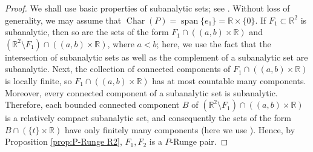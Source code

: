 \documentclass[a4paper,10pt]{amsart}
\newtheorem*{crucial lemma}{Lemma \ref{lem:nice polynomial2}}
\theoremstyle{definition}
\newcommand{\R}{\mathbb{R}}
\newcommand{\charcone}{\operatorname{Char}}
\begin{document}
\begin{proof}
We shall use basic properties of subanalytic sets; see \cite[Remark after Definition  3.1, Gabrielov’s Complement Theorem 3.10 and Theorem 3.14]{BierstoneMilman1988}. Without loss of generality, we may assume that $\charcone(P)=\operatorname{span}\{e_1\}=\R\times\{0\}$.
If $F_1\subset\R^2$ is subanalytic, then so are the sets of the form $F_1\cap ((a,b)\times\R)$ and $(\R^2\setminus F_1)\cap((a,b)\times\R)$,  where $a<b$; here, we use the fact that the intersection of subanalytic sets as well as the complement of a subanalytic set are subanalytic. Next, the collection of connected components of $F_1\cap ((a,b)\times\R)$ is locally finite, so  $F_1\cap ((a,b)\times\R)$ has at most countable many components. Moreover, every connected component of a subanalytic set is subanalytic.  
Therefore, each bounded connected component $B$ of $(\R^2\setminus F_1)\cap ((a,b)\times\R)$ is a relatively compact subanalytic set, and consequently the sets of the form $B\cap(\{t\}\times\R)$ have only finitely many components (here we use \cite[Theorem 3.14]{BierstoneMilman1988}). Hence, by Proposition \ref{prop:P-Runge R2}, $F_1,F_2$ is a $P$-Runge pair.
\end{proof}
\end{document}

